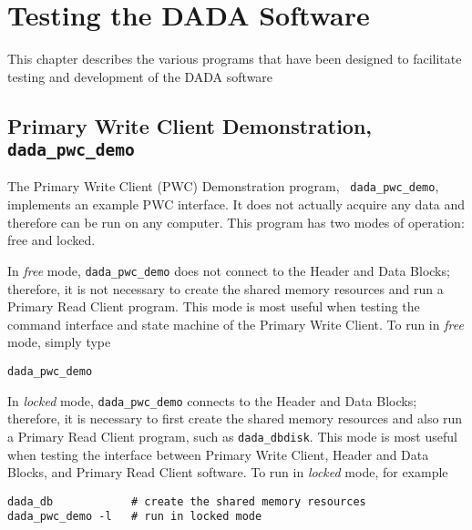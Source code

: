 \chapter{Testing the DADA Software}
\label{app:software}

This chapter describes the various programs that have been designed to
facilitate testing and development of the DADA software

\section{Primary Write Client Demonstration, {\tt dada\_pwc\_demo}}

The Primary Write Client (PWC) Demonstration program, {\tt
dada\_pwc\_demo}, implements an example PWC interface.  It does not
actually acquire any data and therefore can be run on any computer.
This program has two modes of operation: free and locked.

In {\em free} mode, {\tt dada\_pwc\_demo} does not connect to the Header
and Data Blocks; therefore, it is not necessary to create the shared
memory resources and run a Primary Read Client program.  This mode is
most useful when testing the command interface and state machine of
the Primary Write Client.  To run in {\em free} mode, simply type
\begin{verbatim}
dada_pwc_demo
\end{verbatim}

In {\em locked} mode, {\tt dada\_pwc\_demo} connects to the Header
and Data Blocks; therefore, it is necessary to first create the shared
memory resources and also run a Primary Read Client program, such
as {\tt dada\_dbdisk}.  This mode is most useful when testing the
interface between Primary Write Client, Header and Data Blocks, and
Primary Read Client software.  To run in {\em locked} mode, for example
\begin{verbatim}
dada_db            # create the shared memory resources
dada_pwc_demo -l   # run in locked mode
\end{verbatim}

